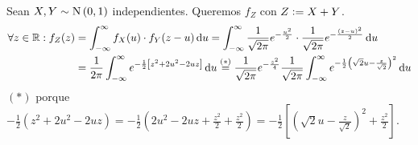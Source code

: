 \begin{ejem}
	Sean $X, Y \sim \operatorname{N}\left(0, 1\right)$ independientes. Queremos $f_Z$ con $Z \vcentcolon= X + Y$.
	\[\begin{aligned}
			\forall z \in \R : f_Z(z) & = \int_{-\infty}^{\infty} f_X(u) \cdot f_Y(z-u) \odif{u} = \int_{-\infty}^{\infty} \frac{1}{\sqrt{2\pi}} e^{-\frac{u^2}{2}} \cdot \frac{1}{\sqrt{2\pi}} e^{-\frac{(z-u)^2}{2}} \odif{u}                                                                                         \\
			                          & = \frac{1}{2\pi} \int_{-\infty}^{\infty} e^{-\frac{1}{2}\left[z^2 + 2u^2 - 2uz\right]} \odif{u} \stackrel{(*)}{=} \frac{1}{\sqrt{2\pi}} e^{-\frac{z^2}{4}} \frac{1}{\sqrt{2\pi}} \int_{-\infty}^{\infty} e^{-\frac{1}{2}\left(\sqrt{2}u - \frac{z}{\sqrt{2}}\right)^2} \odif{u} \\
		\end{aligned}\]
	$(*)$ porque $-\frac{1}{2}(z^2 + 2u^2 - 2uz) = -\frac{1}{2}\left(2u^2 - 2uz +\frac{z^2}{2} + \frac{z^2}{2}\right) = -\frac{1}{2}\left[\left(\sqrt{2}u - \frac{z}{\sqrt{2}}\right)^2 + \frac{z^2}{2}\right]$.


\end{ejem}
